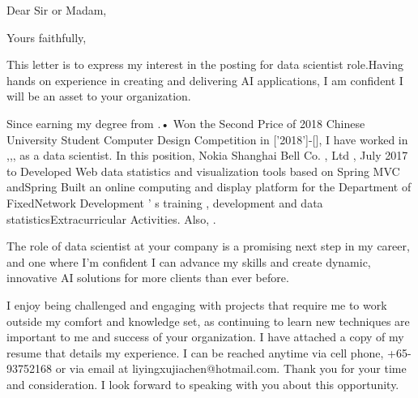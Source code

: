 \documentclass[11pt,a4paper,sans]{moderncv}        %
\begin{document}
\recipient{\quad}{\quad}
\date{March 07 2020}
\opening{Dear Sir or Madam,}
\closing{Yours faithfully,}
\makelettertitle


This letter is to express my interest in the posting for data scientist role.Having hands on experience in creating and delivering AI applications, I am confident I will be an asset to your organization.



Since earning my degree from .• Won the Second Price of 2018 Chinese University Student Computer Design Competition in ['2018']-[], I have worked in ,,, as a data scientist. In this position, Nokia Shanghai Bell Co. , Ltd , July 2017 to Developed Web data statistics and visualization tools based on Spring MVC andSpring Built an online computing and display platform for the Department of FixedNetwork Development ’ s training , development and data statisticsExtracurricular Activities. Also, . 

The role of data scientist at your company is a promising next step in my career, and one where I’m confident I can advance my skills and create dynamic, innovative AI solutions for more clients than ever before.

I enjoy being challenged and engaging with projects that require me to work outside my comfort and knowledge set, as continuing to learn new techniques are important to me and success of your organization.
I have attached a copy of my resume that details my experience. I can be reached anytime via cell phone, +65-93752168 or via email at liyingxujiachen@hotmail.com.
Thank you for your time and consideration. I look forward to speaking with you about this opportunity.


\makeletterclosing
\end{document}
